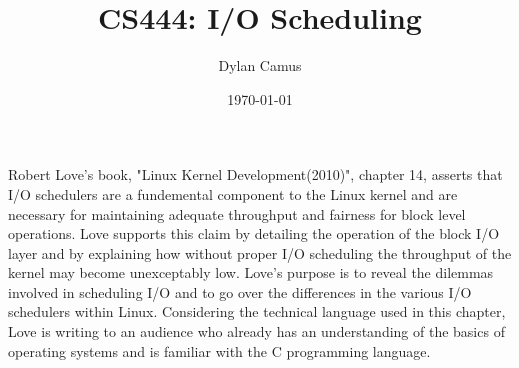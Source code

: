 \documentclass[letterpaper,10pt]{article}
\title{CS444: I/O Scheduling}
\author{Dylan Camus}
\date{\today}
\begin{document}
\maketitle
Robert Love's book, "Linux Kernel Development(2010)", chapter 14, asserts that I/O schedulers are a fundemental component to the Linux kernel and are necessary for maintaining adequate throughput and fairness for block level operations. Love supports this claim by detailing the operation of the block I/O layer and by explaining how without proper I/O scheduling the throughput of the kernel may become unexceptably low. Love's purpose is to reveal the dilemmas involved in scheduling I/O and to go over the differences in the various I/O schedulers within Linux. Considering the technical language used in this chapter, Love is writing to an audience who already has an understanding of the basics of operating systems and is familiar with the C programming language.
\end{document}
